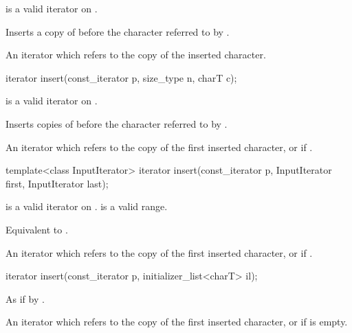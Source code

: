 \begin{itemdescr}
\pnum
\requires
{} is a valid iterator on
.

\pnum
\effects
Inserts a copy of  before the character referred to by .

\pnum
\returns
An iterator which refers to the copy of the inserted character.
\end{itemdescr}

%
\begin{itemdecl}
iterator insert(const_iterator p, size_type n, charT c);
\end{itemdecl}

\begin{itemdescr}
\pnum
\requires
{} is a valid iterator on
.

\pnum
\effects
Inserts  copies of  before the character referred to by .

\pnum
\returns An iterator which refers to the copy of the first inserted character, or
 if .
\end{itemdescr}

%
\begin{itemdecl}
template<class InputIterator>
  iterator insert(const_iterator p, InputIterator first, InputIterator last);
\end{itemdecl}

\begin{itemdescr}
\pnum
\requires
{} is a valid iterator on
.
\tcode{[first, last)}
is a valid range.

\pnum
\effects
Equivalent to
.

\pnum
\returns An iterator which refers to the copy of the first inserted character, or
 if .
\end{itemdescr}

%
\begin{itemdecl}
iterator insert(const_iterator p, initializer_list<charT> il);
\end{itemdecl}

\begin{itemdescr}
\pnum
\effects As if by .

\pnum
\returns An iterator which refers to the copy of the first inserted character, or
 if  is empty.
\end{itemdescr}

